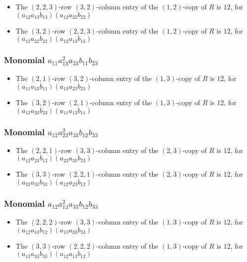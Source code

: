 \documentclass{article}
\begin{document}
\begin{itemize}
\item The $(2, 2, 3)$-row $(3, 2)$-column entry of the $ \left(1, 2\right) $-copy of $R$ is $ 12 $, for $( a_{12} a_{13} b_{13} )( a_{12} a_{22} b_{22} )$ 
\item The $(3, 2)$-row $(2, 2, 3)$-column entry of the $ \left(1, 2\right) $-copy of $R$ is $ 12 $, for $( a_{12} a_{22} b_{22} )( a_{12} a_{13} b_{13} )$ 
\end{itemize}
\subsubsection{Monomial $ a_{11} a_{13}^{2} a_{23} b_{11} b_{23} $}

\begin{itemize}
\item The $(2, 1)$-row $(3, 2)$-column entry of the $ \left(1, 3\right) $-copy of $R$ is $ 12 $, for $( a_{11} a_{13} b_{11} )( a_{13} a_{23} b_{23} )$ 
\item The $(3, 2)$-row $(2, 1)$-column entry of the $ \left(1, 3\right) $-copy of $R$ is $ 12 $, for $( a_{13} a_{23} b_{23} )( a_{11} a_{13} b_{11} )$ 
\end{itemize}
\subsubsection{Monomial $ a_{12} a_{23}^{2} a_{33} b_{12} b_{33} $}

\begin{itemize}
\item The $(2, 2, 1)$-row $(3, 3)$-column entry of the $ \left(2, 3\right) $-copy of $R$ is $ 12 $, for $( a_{12} a_{23} b_{12} )( a_{23} a_{33} b_{33} )$ 
\item The $(3, 3)$-row $(2, 2, 1)$-column entry of the $ \left(2, 3\right) $-copy of $R$ is $ 12 $, for $( a_{23} a_{33} b_{33} )( a_{12} a_{23} b_{12} )$ 
\end{itemize}
\subsubsection{Monomial $ a_{12} a_{13}^{2} a_{33} b_{12} b_{33} $}

\begin{itemize}
\item The $(2, 2, 2)$-row $(3, 3)$-column entry of the $ \left(1, 3\right) $-copy of $R$ is $ 12 $, for $( a_{12} a_{13} b_{12} )( a_{13} a_{33} b_{33} )$ 
\item The $(3, 3)$-row $(2, 2, 2)$-column entry of the $ \left(1, 3\right) $-copy of $R$ is $ 12 $, for $( a_{13} a_{33} b_{33} )( a_{12} a_{13} b_{12} )$ 
\end{itemize}
\end{document}
